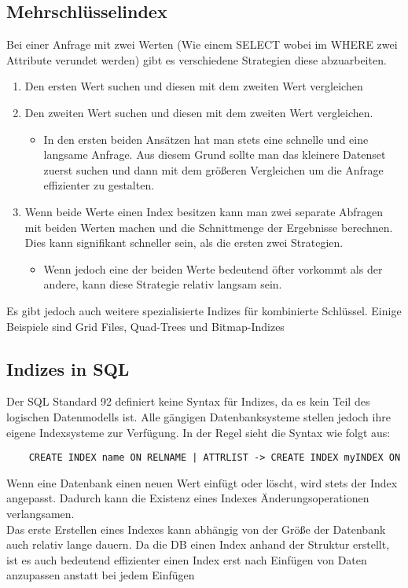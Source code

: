 \documentclass{article}
\begin{document}
	\subsection{Mehrschlüsselindex}
	Bei einer Anfrage mit zwei Werten (Wie einem SELECT wobei im WHERE zwei Attribute verundet werden) gibt es verschiedene Strategien diese abzuarbeiten.
	\begin{enumerate}
		\item{Den ersten Wert suchen und diesen mit dem zweiten Wert vergleichen}
		\item{Den zweiten Wert suchen und diesen mit dem zweiten Wert vergleichen.}
		\begin{itemize}
			\item{In den ersten beiden Ansätzen hat man stets eine schnelle und eine langsame Anfrage. Aus diesem Grund sollte man das kleinere Datenset zuerst suchen und dann mit dem größeren Vergleichen um die Anfrage effizienter zu gestalten.}
		\end{itemize}
		\item{Wenn beide Werte einen Index besitzen kann man zwei separate Abfragen mit beiden Werten machen und die Schnittmenge der Ergebnisse berechnen. Dies kann signifikant schneller sein, als die ersten zwei Strategien.}
		\begin{itemize}
			\item{Wenn jedoch eine der beiden Werte bedeutend öfter vorkommt als der andere, kann diese Strategie relativ langsam sein.}
		\end{itemize}
	\end{enumerate}
	Es gibt jedoch auch weitere spezialisierte Indizes für kombinierte Schlüssel. Einige Beispiele sind Grid Files, Quad-Trees und Bitmap-Indizes 
	\subsection{Indizes in SQL}
	Der SQL Standard 92 definiert keine Syntax für Indizes, da es kein Teil des logischen Datenmodells ist. Alle gängigen Datenbanksysteme stellen jedoch ihre eigene Indexsysteme zur Verfügung. In der Regel sieht die Syntax wie folgt aus:
	\begin{verbatim}
	CREATE INDEX name ON RELNAME | ATTRLIST -> CREATE INDEX myINDEX ON
	\end{verbatim}
	Wenn eine Datenbank einen neuen Wert einfügt oder löscht, wird stets der Index angepasst. Dadurch kann die Existenz eines Indexes Änderungsoperationen verlangsamen. \\
	Das erste Erstellen eines Indexes kann abhängig von der Größe der Datenbank auch relativ lange dauern. Da die DB einen Index anhand der Struktur erstellt, ist es auch bedeutend effizienter einen Index erst nach Einfügen von Daten anzupassen anstatt bei jedem Einfügen
\end{document}
